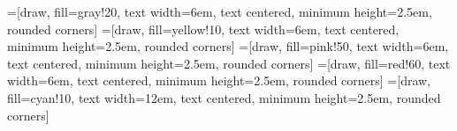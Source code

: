 \documentclass[a4paper, german, 12pt, onecolumn, oneside,bibliography=totoc,listof=totoc]{article}
\begin{document}
\pagestyle{empty}
\renewcommand{\baselinestretch}{1.5}\normalsize

\tikzset{
    >=stealth'
}


=[draw, fill=gray!20, text width=6em, 
    text centered, minimum height=2.5em, rounded corners]
=[draw, fill=yellow!10, text width=6em, 
    text centered, minimum height=2.5em, rounded corners]
=[draw, fill=pink!50, text width=6em, 
    text centered, minimum height=2.5em, rounded corners]
=[draw, fill=red!60, text width=6em, 
    text centered, minimum height=2.5em, rounded corners]
=[draw, fill=cyan!10, text width=12em, 
    text centered, minimum height=2.5em, rounded corners]
\def\blockdist{3}

\end{document}
